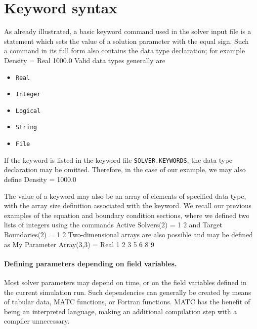  








\section{Keyword syntax}
As already illustrated,
a basic keyword command used in the solver input file
is a statement which sets the value of a solution parameter with the equal sign.
Such a command in its full form also contains the data type declaration; for example
\ttbegin
Density = Real 1000.0
\ttend
Valid data types generally are
\begin{itemize}
\item {\tt Real}
\item {\tt Integer}
\item {\tt Logical}
\item {\tt String}
\item {\tt File}
\end{itemize}
If the keyword is listed in the keyword file {\tt SOLVER.KEYWORDS}, the data type declaration
may be omitted. Therefore, in the case of our example, we may also define
\ttbegin
Density = 1000.0
\ttend

The value of a keyword may also be an array of elements of specified data type, 
with the array size definition associated with the keyword. We recall our previous examples
of the equation and boundary condition sections, where we defined two lists of integers
using the commands
\ttbegin
Active Solvers(2) = 1 2
\ttend
and
\ttbegin
Target Boundaries(2) = 1 2
\ttend
Two-dimensional arrays are also possible and may be defined as
\ttbegin
My Parameter Array(3,3) = Real 1 2 3  5 6  8 9 

\ttend

%


\paragraph{Defining parameters depending on field variables.}
Most solver parameters may depend on time, or on the field variables defined in the current simulation run. 
Such dependencies can generally be created by means of
tabular data,  MATC  functions, or Fortran  functions. MATC has the benefit of being an interpreted 
language, making an additional compilation step with a compiler unnecessary.

